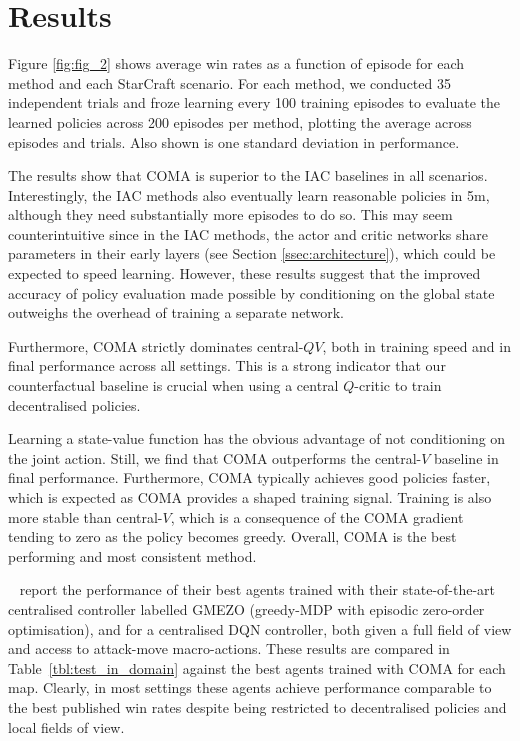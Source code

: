 \documentclass[letterpaper]{article}
\newcommand{\citet}[1]{\citeauthor{#1}~\shortcite{#1}}
\begin{document}
\section{Results}
\label{sec:results}

Figure \ref{fig:fig_2} shows average win rates as a function of episode
for each method and each StarCraft scenario. For each method, we conducted 35
independent trials and froze learning every 100 training episodes to evaluate
the learned policies across 200 episodes per method, plotting the average across
episodes and trials. Also shown is one standard deviation in performance.

The results show that COMA is superior to the IAC baselines in all scenarios. Interestingly, the IAC methods also eventually learn reasonable policies in
5m, although they need substantially more episodes to do so. This may seem
counterintuitive since in the IAC methods, the actor and critic networks share
parameters in their early layers (see Section
\ref{ssec:architecture}), which could be expected to speed learning. However, these 
results suggest that the improved accuracy of policy evaluation made 
possible by conditioning on the global state outweighs the overhead of training 
a separate network.

Furthermore, COMA strictly dominates \mbox{central-$QV$}, both in training 
speed and in final performance across all settings. This is a strong indicator 
that our counterfactual baseline is crucial when using a central $Q$-critic to 
train decentralised policies.

Learning a state-value function has the obvious advantage of not conditioning 
on the joint action. Still, we find that COMA outperforms the 
\mbox{central-$V$} baseline in final performance. Furthermore, COMA typically achieves good 
policies faster, which is expected as COMA provides a shaped training signal. 
Training is also more stable  than \mbox{central-$V$}, which is a consequence of the COMA gradient 
tending to zero as the policy becomes greedy. Overall, COMA is the best 
performing and most consistent method.

\citet{usunier2016episodic} report the performance of their best agents trained with their 
state-of-the-art centralised controller labelled GMEZO (greedy-MDP with 
episodic zero-order optimisation), and for a centralised DQN controller, both 
given a full field of view and access to attack-move macro-actions. These 
results are compared in Table~\ref{tbl:test_in_domain} against the best agents 
trained with COMA for each map. Clearly, in most settings these agents achieve 
performance comparable to the best published win rates despite being 
restricted to decentralised policies and local fields of view.
\end{document}
